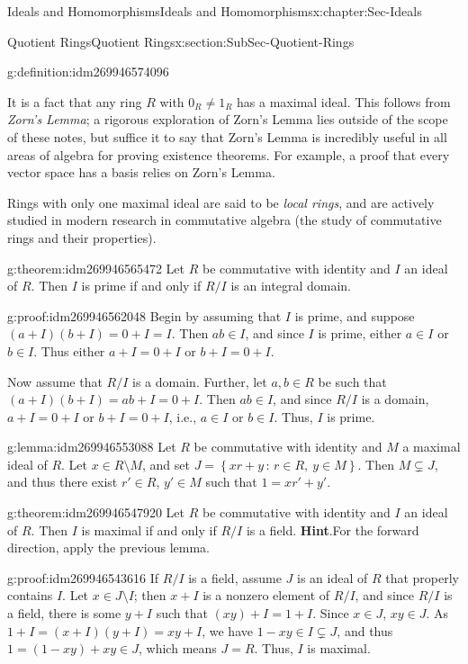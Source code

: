 \documentclass[oneside,10pt,]{book}
\numberwithin{equation}{section}
\newcommand{\setof}[2]{{\left\{#1\,\colon\,#2\right\}}}
\begin{document}
\begin{chapterptx}{Ideals and Homomorphisms}{}{Ideals and Homomorphisms}{}{}{x:chapter:Sec-Ideals}
\begin{sectionptx}{Quotient Rings}{}{Quotient Rings}{}{}{x:section:SubSec-Quotient-Rings}
\begin{definition}{}{g:definition:idm269946574096}
\end{definition}
It is a fact that any ring \(R\) with \(0_R\ne 1_R\) has a maximal ideal. This follows from \emph{Zorn's Lemma}; a rigorous exploration of Zorn's Lemma lies outside of the scope of these notes, but suffice it to say that Zorn's Lemma is incredibly useful in all areas of algebra for proving existence theorems. For example, a proof that every vector space has a basis relies on Zorn's Lemma.%
\par
Rings with only one maximal ideal are said to be \emph{local rings}, and are actively studied in modern research in commutative algebra (the study of commutative rings and their properties).%
\begin{theorem}{}{}{g:theorem:idm269946565472}%
Let \(R\) be commutative with identity and \(I\) an ideal of \(R\). Then \(I\) is prime if and only if \(R/I\) is an integral domain.%
\end{theorem}
\begin{proofptx}{}{g:proof:idm269946562048}
Begin by assuming that \(I\) is prime, and suppose \((a+I)(b+I) = 0+I = I\). Then \(ab \in I\), and since \(I\) is prime, either \(a\in I\) or \(b\in I\). Thus either \(a+I = 0+I\) or \(b+I = 0+I\).%
\par
Now assume that \(R/I\) is a domain. Further, let \(a,b\in R\) be such that \((a+I)(b+I) = ab+I = 0+I\). Then \(ab\in I\), and since \(R/I\) is a domain, \(a+I = 0+I\) or \(b+I = 0+I\), i.e., \(a\in I\) or \(b\in I\). Thus, \(I\) is prime.%
\end{proofptx}
\begin{lemma}{}{}{g:lemma:idm269946553088}%
Let \(R\) be commutative with identity and \(M\) a maximal ideal of \(R\). Let \(x\in R\setminus M\), and set \(J = \setof{xr+y}{r\in R, \ y\in M}\). Then \(M\subsetneq J\), and thus there exist \(r'\in R\), \(y'\in M\) such that \(1 = xr'+y'\).%
\end{lemma}
\begin{theorem}{}{}{g:theorem:idm269946547920}%
Let \(R\) be commutative with identity and \(I\) an ideal of \(R\). Then \(I\) is maximal if and only if \(R/I\) is a field.%
\textbf{Hint}.\quad{}For the forward direction, apply the previous lemma.%
\end{theorem}
\begin{proofptx}{}{g:proof:idm269946543616}
If \(R/I\) is a field, assume \(J\) is an ideal of \(R\) that properly contains \(I\). Let \(x\in J\setminus I\); then \(x+I\) is a nonzero element of \(R/I\), and since \(R/I\) is a field, there is some \(y+I\) such that \((xy)+I = 1+I\). Since \(x\in J\), \(xy\in J\). As \(1+I = (x+I)(y+I) = xy+I\), we have \(1-xy\in I\subsetneq J\), and thus \(1 = (1-xy)+xy \in J\), which means \(J = R\). Thus, \(I\) is maximal.%

\end{proofptx}
\end{sectionptx}
\end{chapterptx}
\end{document}
